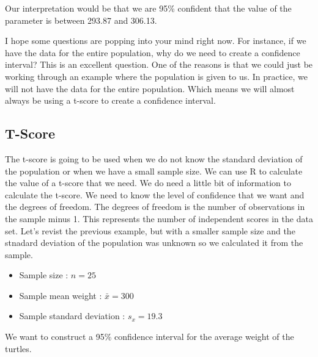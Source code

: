 \documentclass[
  letterpaper,
  DIV=11,
  numbers=noendperiod]{scrreprt}
\providecommand{\tightlist}{%
  \setlength{\itemsep}{0pt}\setlength{\parskip}{0pt}}\usepackage{longtable,booktabs,array}
\begin{document}
Our interpretation would be that we are 95\% confident that the value of
the parameter is between 293.87 and 306.13.

I hope some questions are popping into your mind right now. For
instance, if we have the data for the entire population, why do we need
to create a confidence interval? This is an excellent question. One of
the reasons is that we could just be working through an example where
the population is given to us. In practice, we will not have the data
for the entire population. Which means we will almost always be using a
t-score to create a confidence interval.

\subsection*{T-Score}\label{t-score}

The t-score is going to be used when we do not know the standard
deviation of the population or when we have a small sample size. We can
use R to calculate the value of a t-score that we need. We do need a
little bit of information to calculate the t-score. We need to know the
level of confidence that we want and the degrees of freedom. The degrees
of freedom is the number of observations in the sample minus 1. This
represents the number of independent scores in the data set. Let's
revist the previous example, but with a smaller sample size and the
stnadard deviation of the population was unknown so we calculated it
from the sample.

\begin{itemize}
\tightlist
\item
  Sample size : \(n=25\)
\item
  Sample mean weight : \(\bar{x} = 300\)
\item
  Sample standard deviation : \(s_x = 19.3\)
\end{itemize}

We want to construct a 95\% confidence interval for the average weight
of the turtles.
\end{document}
